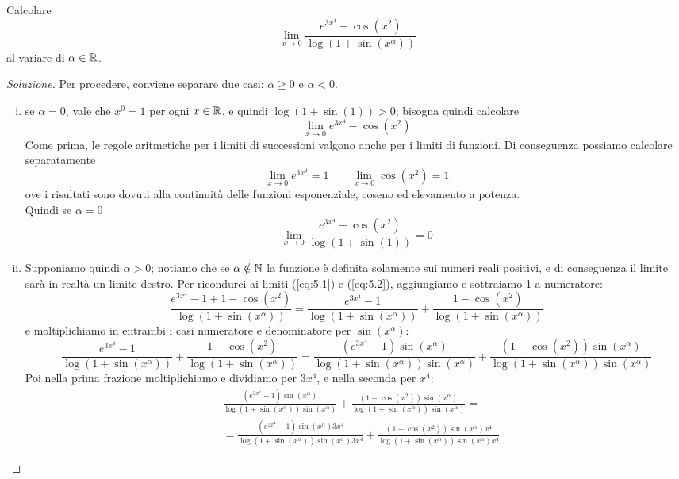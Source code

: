 \begin{exercise}
    \label{ex:5.2}
    Calcolare
    \[
    \lim_{x\to 0}\frac{e^{3x^4}-\cos(x^2)}{\log(1+\sin(x^\alpha))}
    \]
    al variare di $\alpha\in\amsbb{R}$.
\end{exercise}
\begin{proof}[Soluzione]
    Per procedere, conviene separare due casi: $\alpha\ge 0$ e $\alpha<0$.
    \begin{enumerate}[(i)]
        \item se $\alpha=0$, vale che $x^0=1$ per ogni $x\in\amsbb{R}$, e quindi $\log(1+\sin(1))> 0$; bisogna quindi calcolare
        \[
        \lim_{x\to 0}e^{3x^4}-\cos(x^2)
        \]
        Come prima, le regole aritmetiche per i limiti di successioni valgono anche per i limiti di funzioni. Di conseguenza possiamo calcolare separatamente 
        \[
        \lim_{x\to0}e^{3x^4} = 1 \qquad \lim_{x\to 0}\cos(x^2) = 1
        \]
        ove i risultati sono dovuti alla continuità delle funzioni esponenziale, coseno ed elevamento a potenza.\\
        Quindi se $\alpha=0$
        \[
        \lim_{x\to 0}\frac{e^{3x^4}-\cos(x^2)}{\log(1+\sin(1))} = 0
        \]
        \item Supponiamo quindi $\alpha>0$; notiamo che se $\alpha\notin \amsbb{N}$ la funzione è definita solamente sui numeri reali positivi, e di conseguenza il limite sarà in realtà un limite destro. Per ricondurci ai limiti (\ref{eq:5.1}) e (\ref{eq:5.2}), aggiungiamo e sottraiamo 1 a numeratore:
        \[
        \frac{e^{3x^4}-1+1-\cos(x^2)}{\log(1+\sin(x^\alpha))} = \frac{e^{3x^4}-1}{\log(1+\sin(x^\alpha))}+\frac{1-\cos(x^2)}{\log(1+\sin(x^\alpha))}
        \]
        e moltiplichiamo in entrambi i casi numeratore e denominatore per $\sin(x^\alpha)$:
        \[
        \frac{e^{3x^4}-1}{\log(1+\sin(x^\alpha))}+\frac{1-\cos(x^2)}{\log(1+\sin(x^\alpha))} = \frac{(e^{3x^4}-1)\sin(x^\alpha)}{\log(1+\sin(x^\alpha))\sin(x^\alpha)}+\frac{(1-\cos(x^2))\sin(x^\alpha)}{\log(1+\sin(x^\alpha))\sin(x^\alpha)}
        \]
        Poi nella prima frazione moltiplichiamo e dividiamo per $3x^4$, e nella seconda per $x^4$:
        \[
        \begin{split}
           & \frac{(e^{3x^4}-1)\sin(x^\alpha)}{\log(1+\sin(x^\alpha))\sin(x^\alpha)}+\frac{(1-\cos(x^2))\sin(x^\alpha)}{\log(1+\sin(x^\alpha))\sin(x^\alpha)} = \\
            & = \frac{(e^{3x^4}-1)\sin(x^\alpha)3x^4}{\log(1+\sin(x^\alpha))\sin(x^\alpha)3x^4}+\frac{(1-\cos(x^2))\sin(x^\alpha)x^4}{\log(1+\sin(x^\alpha))\sin(x^\alpha)x^4}

\end{split}\]
\end{enumerate}
\end{proof}
